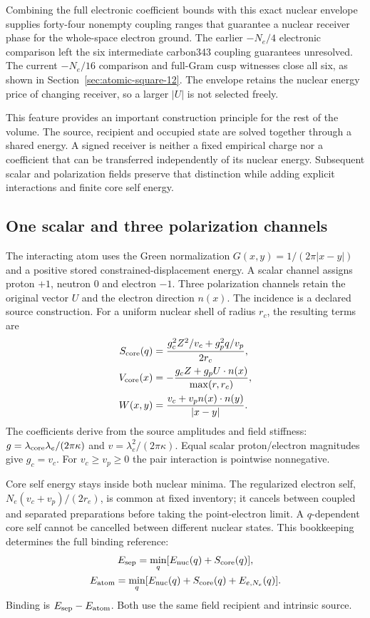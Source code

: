 Combining the full electronic coefficient bounds with this exact nuclear envelope supplies forty-four nonempty coupling ranges that guarantee a nuclear receiver phase for the whole-space electron ground. The earlier $-N_e/4$ electronic comparison left the six intermediate carbon343 coupling guarantees unresolved. The current $-N_e/16$ comparison and full-Gram cusp witnesses close all six, as shown in Section~\ref{sec:atomic-square-12}. The envelope retains the nuclear energy price of changing receiver, so a larger $|U|$ is not selected freely.

This feature provides an important construction principle for the rest of the volume. The source, recipient and occupied state are solved together through a shared energy. A signed receiver is neither a fixed empirical charge nor a coefficient that can be transferred independently of its nuclear energy. Subsequent scalar and polarization fields preserve that distinction while adding explicit interactions and finite core self energy.

\subsection{One scalar and three polarization channels}

The interacting atom uses the Green normalization $G(x,y)=1/(2\pi|x-y|)$ and a positive stored constrained-displacement energy. A scalar channel assigns proton $+1$, neutron $0$ and electron $-1$. Three polarization channels retain the original vector $U$ and the electron direction $n(x)$. The incidence is a declared source construction. For a uniform nuclear shell of radius $r_c$, the resulting terms are
\begin{align*}
 S_{\rm core}(q)&=\frac{g_c^2Z^2/v_c+g_p^2q/v_p}{2r_c},\\
 V_{\rm core}(x)&=-\frac{g_cZ+g_pU\cdot n(x)}{\max(r,r_c)},\\
 W(x,y)&=\frac{v_c+v_p n(x)\cdot n(y)}{|x-y|}.
\end{align*}
The coefficients derive from the source amplitudes and field stiffness: $g=\lambda_{\rm core}\lambda_e/(2\pi\kappa)$ and $v=\lambda_e^2/(2\pi\kappa)$. Equal scalar proton/electron magnitudes give $g_c=v_c$. For $v_c\geq v_p\geq0$ the pair interaction is pointwise nonnegative. 

Core self energy stays inside both nuclear minima. The regularized electron self, $N_e(v_c+v_p)/(2r_e)$, is common at fixed inventory; it cancels between coupled and separated preparations before taking the point-electron limit. A $q$-dependent core self cannot be cancelled between different nuclear states. This bookkeeping determines the full binding reference:
\[
\begin{gathered}
E_{\rm sep}=\min_q[E_{\rm nuc}(q)+S_{\rm core}(q)],\\
 E_{\rm atom}=\min_q[E_{\rm nuc}(q)+S_{\rm core}(q)+E_{e,N_e}(q)].
\end{gathered}
\]
Binding is $E_{\rm sep}-E_{\rm atom}$. Both use the same field recipient and intrinsic source.


